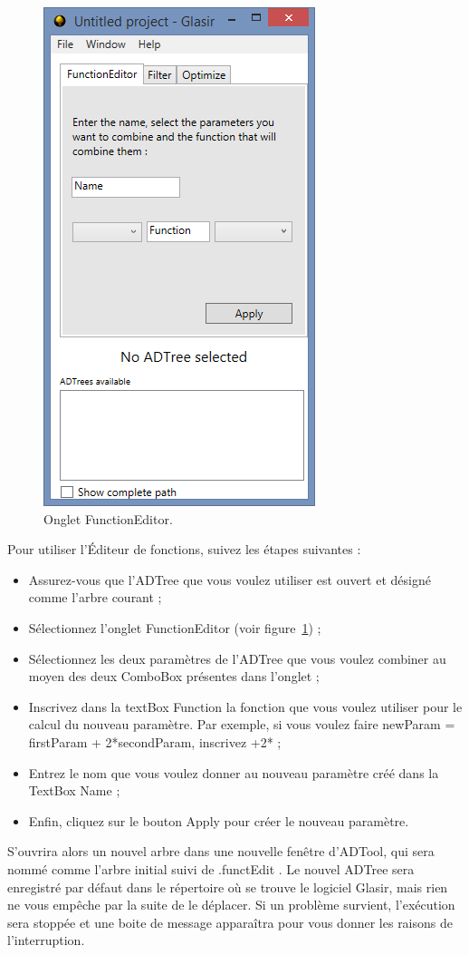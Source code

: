  \begin{figure}[H]
        \centering
        \includegraphics[height=0.7\textwidth]{figure/functionEdition.png}
        \caption{Onglet FunctionEditor.}
        \label{fig:functEdit}
    \end{figure}

Pour utiliser l'Éditeur de fonctions, suivez les étapes suivantes : 

\begin{itemize}
\item Assurez-vous que l'ADTree que vous voulez utiliser est ouvert et désigné comme l'arbre courant ;
\item Sélectionnez l'onglet \og FunctionEditor \fg{} (voir {\sc figure}~\ref{fig:functEdit}) ;
\item Sélectionnez les deux paramètres de l'ADTree que vous voulez combiner au moyen des deux ComboBox présentes dans l'onglet ;
\item Inscrivez dans la textBox \og Function \fg{} la fonction que vous voulez utiliser pour le calcul du nouveau paramètre. Par exemple, si vous voulez faire \og newParam = firstParam + 2*secondParam\fg , inscrivez \og +2* \fg{} ;
\item Entrez le nom que vous voulez donner au nouveau paramètre créé dans la TextBox \og Name \fg{} ;
\item Enfin, cliquez sur le bouton \og Apply\fg{} pour créer le nouveau paramètre.
\end{itemize} 

S'ouvrira alors un nouvel arbre dans une nouvelle fenêtre d'ADTool, qui sera nommé comme l'arbre initial suivi de \og .functEdit \fg{} . Le nouvel ADTree sera enregistré par défaut dans le répertoire où se trouve le logiciel Glasir, mais rien ne vous empêche par la suite de le déplacer. 
Si un problème survient, l'exécution sera stoppée et une boite de message apparaîtra pour vous donner les raisons de l'interruption.

